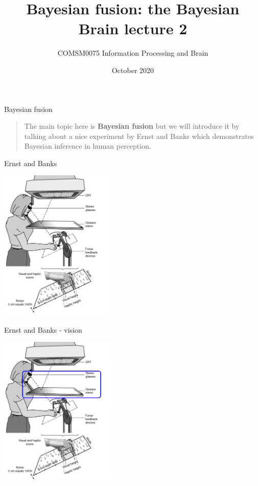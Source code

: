 \documentclass{beamer}
\title[The Bayesian Brain lecture 2]{Bayesian fusion: the Bayesian Brain lecture 2}
\author{COMSM0075 Information Processing and Brain}
\institute{\texttt{comsm0075.github.io}}
\date{October 2020}
\begin{document}
\maketitle



\begin{frame}{Bayesian fusion}
  \begin{quote}
    The main topic here is \textbf{Bayesian fusion} but we will introduce it by talking about a nice experiment by Ernst and Banks which demonstrates Bayesian inference in human perception.
  \end{quote}
  \vfill
\end{frame}

\begin{frame}{Ernst and Banks}
\begin{center}
\includegraphics[width=5.5cm]{fig_ernstbanks.png}
\end{center}
  \vfill
\end{frame}


\begin{frame}{Ernst and Banks - vision}
\begin{center}
\includegraphics[width=5.5cm]{fig_ernstbanks_vision.png}
\end{center}
  \vfill
\end{frame}
\end{document}
